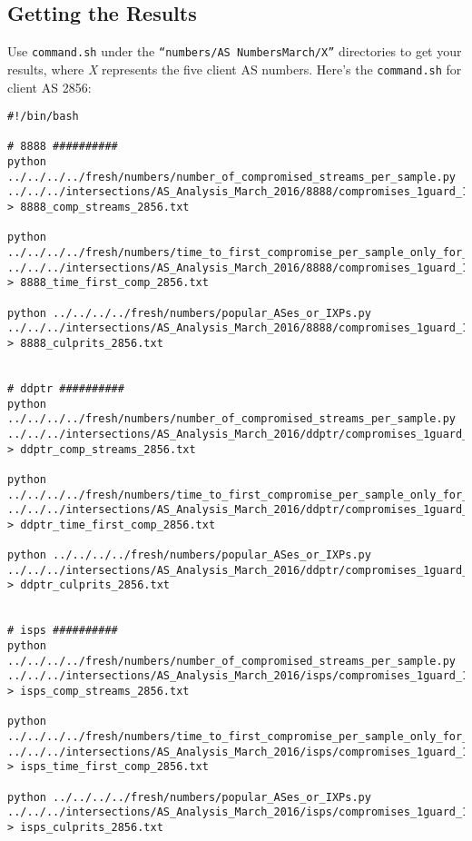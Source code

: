 \documentclass{article}
\begin{document}
\subsection{Getting the Results}
Use {\tt command.sh} under the {\tt ``numbers/AS\textunderscore 
Numbers\textunderscore March/\emph{X}''} directories 
to get your results, where \emph{X} represents the five client AS numbers. 
Here's the {\tt command.sh} for client AS 2856:
\begin{lstlisting}
#!/bin/bash

# 8888 ##########
python ../../../../fresh/numbers/number_of_compromised_streams_per_sample.py 
../../../intersections/AS_Analysis_March_2016/8888/compromises_1guard_100K_2856.pickle 
> 8888_comp_streams_2856.txt

python ../../../../fresh/numbers/time_to_first_compromise_per_sample_only_for_comp.py 
../../../intersections/AS_Analysis_March_2016/8888/compromises_1guard_100K_2856.pickle 
> 8888_time_first_comp_2856.txt

python ../../../../fresh/numbers/popular_ASes_or_IXPs.py 
../../../intersections/AS_Analysis_March_2016/8888/compromises_1guard_100K_2856.pickle 
> 8888_culprits_2856.txt


# ddptr ##########
python ../../../../fresh/numbers/number_of_compromised_streams_per_sample.py 
../../../intersections/AS_Analysis_March_2016/ddptr/compromises_1guard_100K_2856.pickle 
> ddptr_comp_streams_2856.txt

python ../../../../fresh/numbers/time_to_first_compromise_per_sample_only_for_comp.py 
../../../intersections/AS_Analysis_March_2016/ddptr/compromises_1guard_100K_2856.pickle 
> ddptr_time_first_comp_2856.txt

python ../../../../fresh/numbers/popular_ASes_or_IXPs.py 
../../../intersections/AS_Analysis_March_2016/ddptr/compromises_1guard_100K_2856.pickle 
> ddptr_culprits_2856.txt


# isps ##########
python ../../../../fresh/numbers/number_of_compromised_streams_per_sample.py 
../../../intersections/AS_Analysis_March_2016/isps/compromises_1guard_100K_2856.pickle 
> isps_comp_streams_2856.txt

python ../../../../fresh/numbers/time_to_first_compromise_per_sample_only_for_comp.py 
../../../intersections/AS_Analysis_March_2016/isps/compromises_1guard_100K_2856.pickle 
> isps_time_first_comp_2856.txt

python ../../../../fresh/numbers/popular_ASes_or_IXPs.py 
../../../intersections/AS_Analysis_March_2016/isps/compromises_1guard_100K_2856.pickle 
> isps_culprits_2856.txt



\end{lstlisting}
\end{document}
